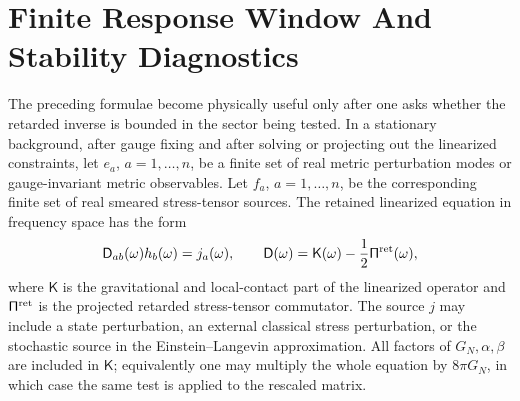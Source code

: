 \section{Finite Response Window And Stability Diagnostics}

The preceding formulae become physically useful only after one asks whether
the retarded inverse is bounded in the sector being tested.  In a stationary
background, after gauge fixing and after solving or projecting out the
linearized constraints, let \(e_a\), \(a=1,\ldots,n\), be a finite set of
real metric perturbation modes or gauge-invariant metric observables.  Let
\(f_a\), \(a=1,\ldots,n\), be the corresponding finite set of real smeared
stress-tensor sources.  The retained linearized equation in frequency space
has the form
\begin{equation}
  \mathsf D_{ab}(\omega)h_b(\omega)=j_a(\omega),
  \qquad
  \mathsf D(\omega)
  =
  \mathsf K(\omega)-\frac12\mathsf\Pi^{\rm ret}(\omega),
  \label{eq:semiclassical-retained-response-matrix}
\end{equation}
where \(\mathsf K\) is the gravitational and local-contact part of the
linearized operator and \(\mathsf\Pi^{\rm ret}\) is the projected retarded
stress-tensor commutator.  The source \(j\) may include a state perturbation,
an external classical stress perturbation, or the stochastic source in the
Einstein--Langevin approximation.  All factors of \(G_N,\alpha,\beta\) are
included in \(\mathsf K\); equivalently one may multiply the whole equation
by \(8\pi G_N\), in which case the same test is applied to the rescaled
matrix.


